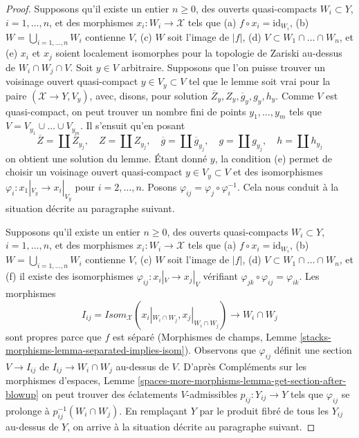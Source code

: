 \begin{proof}
\medskip\noindent
Supposons qu'il existe un entier $n \geq 0$, des ouverts quasi-compacts
$W_i \subset Y$, $i = 1, \ldots, n$, et des
morphismes $x_i : W_i \to \mathcal{X}$ tels que
(a) $f \circ x_i = \text{id}_{W_i}$,
(b) $W = \bigcup_{i = 1, \ldots, n} W_i$ contienne $V$,
(c) $W$ soit l'image de $|f|$,
(d) $V \subset W_1 \cap \ldots \cap W_n$, et
(e) $x_i$ et $x_j$ soient localement isomorphes pour la topologie de Zariski au-dessus de $W_i \cap W_j \cap V$.
Soit $y \in V$ arbitraire.
Supposons que l'on puisse trouver un voisinage ouvert quasi-compact
$y \in V_y \subset V$ tel que le lemme soit vrai pour
la paire $(\mathcal{X} \to Y, V_y)$, avec, disons, pour solution
$\overline{Z}_y, Z_y, \overline{g}_y, g_y, h_y$.
Comme $V$ est quasi-compact, on peut trouver un nombre fini de points
$y_1, \ldots, y_m$ tels que $V = V_{y_1} \cup \ldots \cup V_{y_m}$.
Il s'ensuit qu'en posant
$$
\overline{Z} = \coprod \overline{Z}_{y_j},\quad
Z = \coprod Z_{y_j},\quad
\overline{g} = \coprod \overline{g}_{y_j},\quad
g = \coprod g_{y_j},\quad
h = \coprod h_{y_j}
$$
on obtient une solution du lemme. Étant donné $y$, la condition (e)
permet de choisir un voisinage ouvert quasi-compact $y \in V_y \subset V$
et des isomorphismes $\varphi_i : x_1|_{V_y} \to x_i|_{V_y}$ pour
$i = 2, \ldots, n$. Posons $\varphi_{ij} = \varphi_j \circ \varphi_i^{-1}$.
Cela nous conduit à la situation décrite au paragraphe suivant.

\medskip\noindent
Supposons qu'il existe un entier $n \geq 0$, des ouverts quasi-compacts
$W_i \subset Y$, $i = 1, \ldots, n$, et des
morphismes $x_i : W_i \to \mathcal{X}$ tels que
(a) $f \circ x_i = \text{id}_{W_i}$,
(b) $W = \bigcup_{i = 1, \ldots, n} W_i$ contienne $V$,
(c) $W$ soit l'image de $|f|$,
(d) $V \subset W_1 \cap \ldots \cap W_n$, et
(f) il existe des isomorphismes $\varphi_{ij} : x_i|_V \to x_j|_V$
vérifiant $\varphi_{jk} \circ \varphi_{ij} = \varphi_{ik}$.
Les morphismes
$$
I_{ij} = \mathit{Isom}_\mathcal{X}(x_i|_{W_i \cap W_j},
x_j|_{W_i \cap W_j}) \longrightarrow W_i \cap W_j
$$
sont propres parce que $f$ est séparé
(Morphismes de champs, Lemme
\ref{stacks-morphisms-lemma-separated-implies-isom}).
Observons que $\varphi_{ij}$ définit une section $V \to I_{ij}$
de $I_{ij} \to W_i \cap W_j$ au-dessus de $V$.
D'après Compléments sur les morphismes d'espaces, Lemme
\ref{spaces-more-morphisms-lemma-get-section-after-blowup}
on peut trouver des éclatements $V$-admissibles
$p_{ij} : Y_{ij} \to Y$ tels que $\varphi_{ij}$
se prolonge à $p_{ij}^{-1}(W_i \cap W_j)$.
En remplaçant $Y$ par le produit fibré de tous les $Y_{ij}$
au-dessus de $Y$, on arrive à la situation décrite au paragraphe suivant.


\end{proof}
